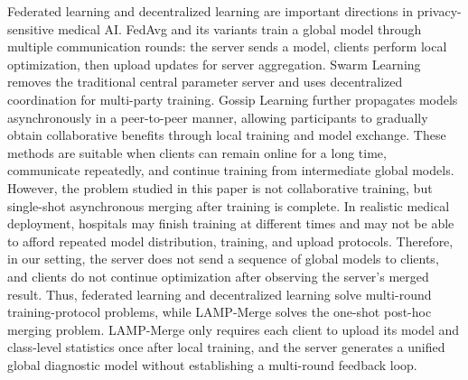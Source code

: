 \documentclass[letterpaper]{article}
\begin{document}
Federated learning and decentralized learning are important directions in privacy-sensitive medical AI. FedAvg and its variants train a global model through multiple communication rounds: the server sends a model, clients perform local optimization, then upload updates for server aggregation. Swarm Learning removes the traditional central parameter server and uses decentralized coordination for multi-party training. Gossip Learning further propagates models asynchronously in a peer-to-peer manner, allowing participants to gradually obtain collaborative benefits through local training and model exchange. These methods are suitable when clients can remain online for a long time, communicate repeatedly, and continue training from intermediate global models. However, the problem studied in this paper is not collaborative training, but single-shot asynchronous merging after training is complete. In realistic medical deployment, hospitals may finish training at different times and may not be able to afford repeated model distribution, training, and upload protocols. Therefore, in our setting, the server does not send a sequence of global models to clients, and clients do not continue optimization after observing the server's merged result. Thus, federated learning and decentralized learning solve multi-round training-protocol problems, while LAMP-Merge solves the one-shot post-hoc merging problem. LAMP-Merge only requires each client to upload its model and class-level statistics once after local training, and the server generates a unified global diagnostic model without establishing a multi-round feedback loop.
\end{document}
